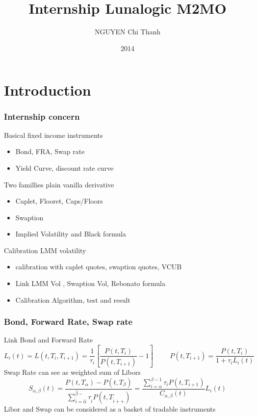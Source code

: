 \documentclass[8pt]{beamer}
\title[Off-Cycle internship]{Internship Lunalogic M2MO}
\author[Chi Thanh NGUYEN]{NGUYEN Chi Thanh}
\institute[Lunalogic - M2MO]{Lunalogic and M2MO}
\date{2014}
\newcommand{\Ti}{T_{i}}
\newcommand{\Tii}{T_{i+1}}
\newcommand{\Pti}{P(t,T_{i})}
\newcommand{\Ptii}{P(t,T_{i+1})}
\newcommand{\Lit}{L_{i}(t)}
\newcommand{\Cab}{C_{\alpha,\beta}}
\begin{document}
\begin{frame}[plain]
\titlepage
\end{frame}

\begin{frame}
\tableofcontents
\end{frame}

\section{Introduction}
\begin{frame}
\frametitle{Internship concern}
Basical fixed income instruments 
\begin{itemize}
	\item Bond, FRA, Swap rate
	\item Yield Curve, discount rate curve
\end{itemize}
Two famillies plain vanilla derivative
\begin{itemize}
	\item Caplet, Flooret, Caps/Floors
	\item Swaption
	\item Implied Volatility and Black formula
\end{itemize}
Calibration LMM volatility
\begin{itemize}
	\item calibration with caplet quotes, swaption quotes, VCUB
	\item Link LMM Vol , Swaption Vol, Rebonato formula
	\item Calibration Algorithm, test and result
\end{itemize}
\end{frame}


\begin{frame}
\frametitle{Bond, Forward Rate, Swap rate}
Link Bond and Forward Rate
\[
L_i(t) = L(t,\Ti,\Tii) = \frac{1}{\tau_i} \left[ \frac{\Pti}{\Ptii} - 1  \right]
\hspace{1cm}
{\Ptii} = \frac{\Pti}{1+ \tau_i L_i(t)}
\]
Swap Rate can see as weighted sum of Libors
\[
S_{\alpha,\beta}(t) 
= 
\frac{P(t,T_{\alpha})-P(t,T_{\beta})}{\sum^{\hat{\beta}-}_{\hat{i}=\hat{\alpha}}\tau_{\hat{i}}P(t,T_{\hat{i}++})} 
=
\frac{\sum^{\beta-1}_{i=\alpha} \tau_i \Ptii }{\Cab(t)} \Lit
\]
Libor and Swap can be considered as a basket of tradable instruments
\end{frame}
\end{document}
